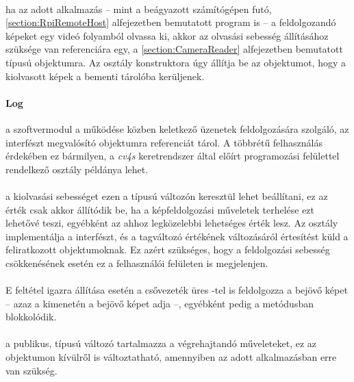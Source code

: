 \paragraph{} ha az adott alkalmazás -- mint a beágyazott számítógépen futó, \ref{section:RpiRemoteHost} alfejezetben bemutatott program is -- a feldolgozandó képeket egy videó folyamból olvassa ki, akkor az olvasási sebesség állításához szüksége van referenciára egy, a \ref{section:CameraReader} alfejezetben bemutatott típusú objektumra. Az osztály konstruktora úgy állítja be az objektumot, hogy a kiolvasott képek a bementi tárolóba kerüljenek. 

\paragraph{Log} a szoftvermodul a működése közben keletkező üzenetek feldolgozására szolgáló, az  interfészt megvalósító objektumra referenciát tárol. A többrétű felhasználás érdekében ez bármilyen, a \emph{cv4s} keretrendszer által előírt programozási felülettel rendelkező osztály példánya lehet.

\paragraph{} a kiolvasási sebességet ezen a  típusú változón keresztül lehet beállítani, ez az érték csak akkor állítódik be, ha a képfeldolgozási műveletek terhelése ezt lehetővé teszi, egyébként az ahhoz legközelebbi lehetséges érték lesz. Az osztály implementálja a  interfészt, és a tagváltozó értékének változásáról értesítést küld a feliratkozott objektumoknak. Ez azért szükséges, hogy a feldolgozási sebesség csökkenésének esetén ez a felhasználói felületen is megjelenjen.

\paragraph{} E feltétel igazra állítása esetén a csővezeték üres -tel is feldolgozza a bejövő képet -- azaz a kimenetén a bejövő képet adja --, egyébként pedig a  metódusban blokkolódik.

\paragraph{} a publikus,  típusú változó tartalmazza a végrehajtandó műveleteket, ez az objektumon kívülről is változtatható, amennyiben az adott alkalmazásban erre van szükség.

